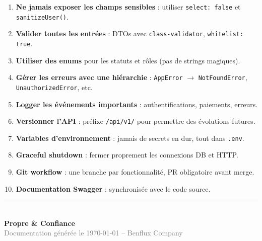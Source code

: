\documentclass[12pt,a4paper]{report}
\begin{document}
\begin{enumerate}
  \item \textbf{Ne jamais exposer les champs sensibles} : utiliser \texttt{select: false} et \texttt{sanitizeUser()}.
  \item \textbf{Valider toutes les entrées} : DTOs avec \texttt{class-validator}, \texttt{whitelist: true}.
  \item \textbf{Utiliser des enums} pour les statuts et rôles (pas de strings magiques).
  \item \textbf{Gérer les erreurs avec une hiérarchie} : \texttt{AppError} $\to$ \texttt{NotFoundError}, \texttt{UnauthorizedError}, etc.
  \item \textbf{Logger les événements importants} : authentifications, paiements, erreurs.
  \item \textbf{Versionner l'API} : préfixe \texttt{/api/v1/} pour permettre des évolutions futures.
  \item \textbf{Variables d'environnement} : jamais de secrets en dur, tout dans \texttt{.env}.
  \item \textbf{Graceful shutdown} : fermer proprement les connexions DB et HTTP.
  \item \textbf{Git workflow} : une branche par fonctionnalité, PR obligatoire avant merge.
  \item \textbf{Documentation Swagger} : synchronisée avec le code source.
\end{enumerate}

\vfill
\begin{center}
\textcolor{primary}{\rule{0.5\linewidth}{1pt}}\\[0.5cm]
{\large\textcolor{primary}{\textbf{Propre \& Confiance}}}\\
{\small\textcolor{gray}{Documentation générée le \today{} -- Benflux Company}}
\end{center}
\end{document}

